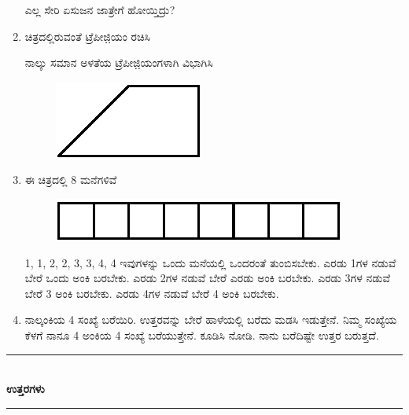 \begin{enumerate}
ಎಲ್ಲ ಸೇರಿ ಏಸುಜನ ಜಾತ್ರೇಗೆ ಹೋಯ್ತಿದ್ರು? 

\item ಚಿತ್ರದಲ್ಲಿರುವಂತೆ ಟ್ರೆಪೀಜಿ಼ಯಂ ರಚಿಸಿ 

ನಾಲ್ಕು ಸಮಾನ ಅಳತೆಯ ಟ್ರೆಪೀಜಿ಼ಯಂಗಳಾಗಿ ವಿಭಾಗಿಸಿ 
\begin{figure}[H]
\centering
\includegraphics[scale=1.5]{images/chap2/q28.eps}
\end{figure}
 
 \eject
 
 \item ಈ ಚಿತ್ರದಲ್ಲಿ 8 ಮನೆಗಳಿವೆ 
 \begin{figure}[H]
\centering
\includegraphics{images/chap2/q29.eps}
\end{figure}

1, 1, 2, 2, 3, 3, 4, 4 ಇವುಗಳನ್ನು ಒಂದು ಮನೆಯಲ್ಲಿ ಒಂದರಂತೆ ತುಂಬಿಸ\break ಬೇಕು. ಎರಡು 1ಗಳ ನಡುವೆ ಬೇರೆ ಒಂದು ಅಂಕಿ ಬರಬೇಕು. ಎರಡು 2ಗಳ ನಡುವೆ ಬೇರೆ ಎರಡು ಅಂಕಿ ಬರಬೇಕು. ಎರಡು 3ಗಳ ನಡುವೆ ಬೇರೆ 3 ಅಂಕಿ ಬರಬೇಕು. ಎರಡು 4ಗಳ ನಡುವೆ ಬೇರೆ 4 ಅಂಕಿ ಬರಬೇಕು.

\item ನಾಲ್ಕಂಕಿಯ 4 ಸಂಖ್ಯೆ ಬರೆಯಿರಿ. ಉತ್ತರವನ್ನು ಬೇರೆ ಹಾಳೆಯಲ್ಲಿ ಬರೆದು ಮಡಸಿ ಇಡುತ್ತೇನೆ. ನಿಮ್ಮ ಸಂಖ್ಯೆಯ ಕೆಳಗೆ ನಾನೂ 4 ಅಂಕಿಯ 4 ಸಂಖ್ಯೆ ಬರೆಯುತ್ತೇನೆ. ಕೂಡಿಸಿ ನೋಡಿ. ನಾನು ಬರೆದಿಷ್ಟೇ ಉತ್ತರ ಬರುತ್ತದೆ. 
\end{enumerate}

\smallskip

\begin{center}
\rule{5cm}{1pt}\\[3pt]
{\Large\bfseries ಉತ್ತರಗಳು}\\[-0.1cm]
\rule{5cm}{1pt}
\end{center}

